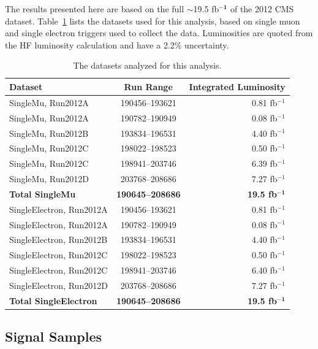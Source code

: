 \par \par The results presented here are based on the full $\sim$19.5
fb$\mathbf{^{-1}}$ of the 2012 CMS dataset.
Table~\ref{tab:dataSamples} lists the datasets used for this analysis,
based on single muon and single electron triggers used to collect the
data.  Luminosities are quoted from the HF luminosity calculation and
have a 2.2\% uncertainty.  

\begin{table}[hbtp]\footnotesize
\centering
\begin{tabular}{|l|c|r|}
\hline\hline
 Dataset & Run Range & Integrated Luminosity \\
\hline
SingleMu, Run2012A & 190456--193621 & 0.81 fb$^{-1}$ \\
SingleMu, Run2012A & 190782--190949 & 0.08 fb$^{-1}$ \\
SingleMu, Run2012B & 193834--196531 & 4.40 fb$^{-1}$ \\
SingleMu, Run2012C & 198022--198523 & 0.50 fb$^{-1}$ \\
SingleMu, Run2012C & 198941--203746 & 6.39 fb$^{-1}$ \\
SingleMu, Run2012D & 203768--208686 & 7.27 fb$^{-1}$ \\
{\bf Total SingleMu} & {\bf 190645--208686} & {\bf 19.5 fb$\mathbf{^{-1}}$} \\
\hline
SingleElectron, Run2012A & 190456--193621 & 0.81 fb$^{-1}$ \\
SingleElectron, Run2012A & 190782--190949 & 0.08 fb$^{-1}$ \\
SingleElectron, Run2012B & 193834--196531 & 4.40 fb$^{-1}$ \\
SingleElectron, Run2012C & 198022--198523 & 0.50 fb$^{-1}$ \\
SingleElectron, Run2012C & 198941--203746 & 6.40 fb$^{-1}$ \\
SingleElectron, Run2012D & 203768--208686 & 7.27 fb$^{-1}$\\
{\bf Total SingleElectron} & {\bf 190645--208686} & {\bf 19.5 fb$\mathbf{^{-1}}$} \\
\hline

\hline\hline
\end{tabular}
\caption{The datasets analyzed for this analysis.}
\label{tab:dataSamples}
\end{table}

 \subsection{Signal Samples}
\label{signal_sample_II_overview}
 
